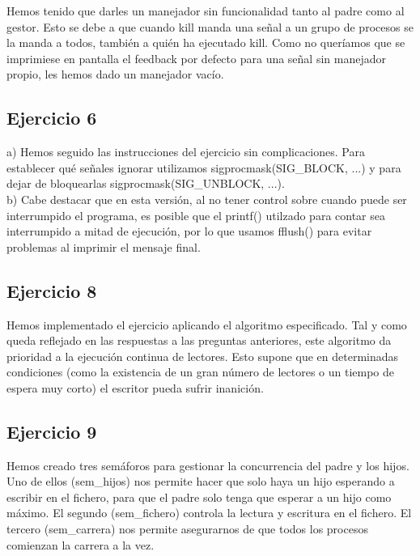 \documentclass[]{article}
\begin{document}
Hemos tenido que darles un manejador sin funcionalidad tanto al padre como al gestor. Esto se debe a que cuando kill manda una señal a un grupo de procesos se la manda a todos, también a quién ha ejecutado kill. Como no queríamos que se imprimiese en pantalla el feedback por defecto para una señal sin manejador propio, les hemos dado un manejador vacío. 

\subsection*{Ejercicio 6}
a) Hemos seguido las instrucciones del ejercicio sin complicaciones. Para establecer qué señales ignorar utilizamos sigprocmask(SIG\_BLOCK, ...) y para dejar de bloquearlas sigprocmask(SIG\_UNBLOCK, ...). \\

b) Cabe destacar que en esta versión, al no tener control sobre cuando puede ser interrumpido el programa, es posible que el printf() utilzado para contar sea interrumpido a mitad de ejecución, por lo que usamos fflush() para evitar problemas al imprimir el mensaje final.

\subsection*{Ejercicio 8}
Hemos implementado el ejercicio aplicando el algoritmo especificado. Tal y como queda reflejado en las respuestas a las preguntas anteriores, este algoritmo da prioridad a la ejecución continua de lectores. Esto supone que en determinadas condiciones (como la existencia de un gran número de lectores o un tiempo de espera muy corto) el escritor pueda sufrir inanición.

\subsection*{Ejercicio 9}
Hemos creado tres semáforos para gestionar la concurrencia del padre y los hijos. Uno de ellos (sem\_hijos) nos permite hacer que solo haya un hijo esperando a escribir en el fichero, para que el padre solo tenga que esperar a un hijo como máximo. El segundo (sem\_fichero) controla la lectura y escritura en el fichero. El tercero (sem\_carrera) nos permite asegurarnos de que todos los procesos comienzan la carrera a la vez.
\end{document}
